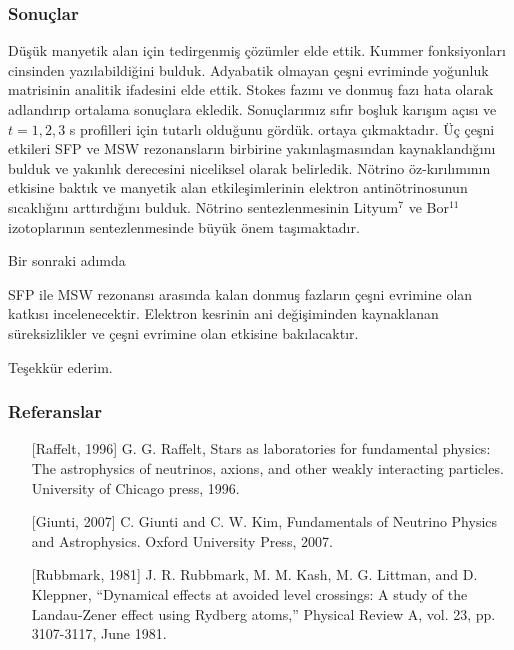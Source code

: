 \documentclass[10pt]{beamer}
\begin{document}
\begin{frame}
    \frametitle{Sonuçlar}
    \scriptsize
    \begin{outline}
        \1[\textbullet] Düşük manyetik alan için {\color{red}tedirgenmiş çözümler} elde ettik.
         Kummer fonksiyonları cinsinden yazılabildiğini bulduk.
        \1[\textbullet] Adyabatik olmayan çeşni evriminde yoğunluk matrisinin analitik ifadesini elde ettik. Stokes fazını ve donmuş fazı hata olarak adlandırıp ortalama sonuçlara ekledik.
         Sonuçlarımız sıfır {\color{red}boşluk karışım açısı ve $ t=1,2,3 $ s} profilleri için tutarlı olduğunu gördük.
         ortaya çıkmaktadır. Üç çeşni etkileri SFP ve MSW rezonansların birbirine yakınlaşmasından kaynaklandığını bulduk ve yakınlık derecesini niceliksel olarak belirledik.
        \1[\textbullet] Nötrino öz-kırılımının etkisine baktık ve manyetik alan etkileşimlerinin elektron antinötrinosunun sıcaklığını arttırdığını bulduk.
        \1[\textbullet] Nötrino sentezlenmesinin Lityum$ ^{7} $ ve Bor$ ^{11} $ izotoplarının sentezlenmesinde büyük önem taşımaktadır.
    \end{outline}
    
    Bir sonraki adımda 
    \begin{outline}
        \1[\textbullet] SFP ile MSW rezonansı arasında kalan donmuş fazların çeşni evrimine olan katkısı incelenecektir.
        \1[\textbullet] Elektron kesrinin ani değişiminden kaynaklanan süreksizlikler ve çeşni evrimine olan etkisine bakılacaktır.
    \end{outline}
    \normalsize
    
\end{frame}

\begin{frame}
    \huge
    \begin{center}
        Teşekkür ederim.
    \end{center}
\end{frame}

\begin{frame}
    \frametitle{Referanslar}
    \footnotesize
    \begin{itemize}
        \item[] [Raffelt, 1996] G. G. Raffelt, Stars as laboratories for fundamental physics: The astrophysics of neutrinos, axions, and other weakly interacting particles. University of Chicago press, 1996.        
        \item[] [Giunti, 2007] C. Giunti and C. W. Kim, Fundamentals of Neutrino Physics and Astrophysics. Oxford University Press, 2007.        
        \item[] [Rubbmark, 1981]  J. R. Rubbmark, M. M. Kash, M. G. Littman, and D. Kleppner, “Dynamical effects at avoided level crossings: A study of the Landau-Zener effect using Rydberg atoms,” Physical Review A, vol. 23, pp. 3107-3117, June 1981.
    \end{itemize}
    \normalsize
\end{frame}
\end{document}
